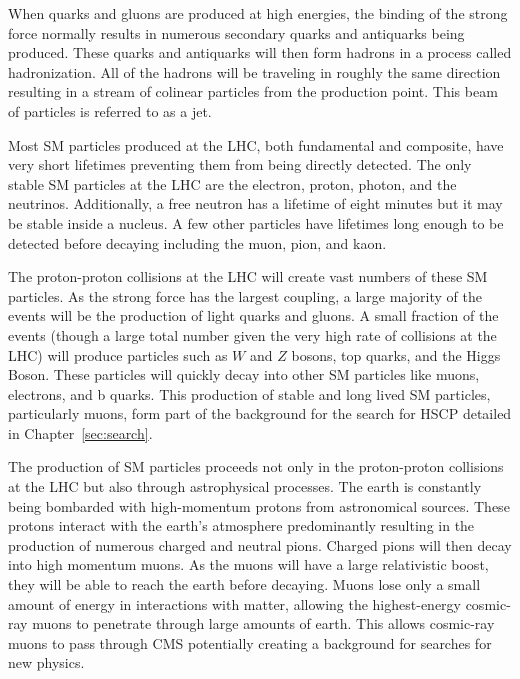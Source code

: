 When quarks and gluons are produced at high energies, the binding of the strong force normally results in numerous secondary quarks and antiquarks being produced.
These quarks and antiquarks will then form hadrons in a process called hadronization.
All of the hadrons will be traveling in roughly the same direction resulting in a stream of colinear particles from the production point.
This beam of particles is referred to as a jet.

Most SM particles produced at the LHC, both fundamental and composite, have very short lifetimes preventing them from being directly detected. The only stable SM particles
at the LHC are the electron, proton, photon, and the neutrinos. Additionally, a free neutron has a lifetime of eight minutes but it may be stable inside a nucleus.
A few other particles have lifetimes long enough to be detected before decaying including the muon, pion, and kaon.

The proton-proton collisions at the LHC will create vast numbers of these SM particles. As the strong force has the largest coupling,
a large majority of the events will be the production of light quarks and gluons. A small fraction of the events (though a large total number given the very
high rate of collisions at the LHC) will produce particles such as $W$ and $Z$ bosons, top quarks, and the Higgs Boson.
These particles will quickly decay into other SM particles like muons, electrons, and b quarks. This production of stable and long lived SM particles,
particularly muons, form part of the background for the search for HSCP detailed in Chapter~\ref{sec:search}.

The production of SM particles proceeds not only in the proton-proton collisions at the LHC but also through astrophysical processes.
The earth is constantly being bombarded with high-momentum protons from astronomical sources. These protons interact with the earth's atmosphere
predominantly resulting in the production of numerous charged and neutral pions. Charged pions will then decay into high momentum muons.
As the muons will have a large relativistic boost, they will be able to reach the earth before decaying.
Muons lose only a small amount of energy in interactions with matter,
allowing the highest-energy cosmic-ray muons to penetrate through large amounts of earth.
This allows cosmic-ray muons to pass through CMS potentially creating a background for searches for new physics.

